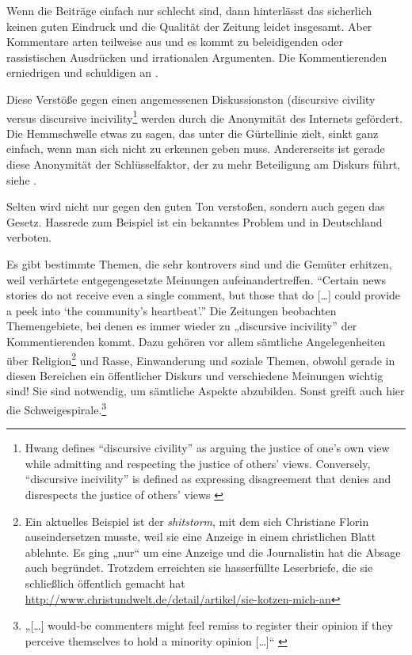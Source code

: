 Wenn die Beiträge einfach nur schlecht sind, dann hinterlässt das sicherlich
keinen guten Eindruck und die Qualität der Zeitung leidet insgesamt. Aber
Kommentare arten teilweise aus und es kommt zu beleidigenden oder rassistischen
Ausdrücken und irrationalen Argumenten. Die Kommentierenden erniedrigen und
schuldigen an \autocite[S.~103]{reich}.

Diese Verstöße gegen einen angemessenen Diskussionston (\glqq discursive
civility\grqq{} versus \glqq discursive incivility\grqq\footnote{Hwang defines
  ``discursive civility'' as arguing the justice of one's own view while
  admitting and respecting the justice of others' views. Conversely,
  ``discursive incivility'' is defined as expressing disagreement that denies
and disrespects the justice of others' views \autocite{hwang}
\autocite[S.~6/7]{santana:2014}} werden durch die Anonymität des Internets
gefördert. Die Hemmschwelle etwas zu sagen, das unter die Gürtellinie zielt,
sinkt ganz einfach, wenn man sich nicht zu erkennen geben muss. Andererseits ist
gerade diese Anonymität der Schlüsselfaktor, der zu mehr Beteiligung am Diskurs
führt, siehe
.

Selten wird nicht nur gegen den guten Ton verstoßen, sondern auch gegen das
Gesetz. Hassrede zum Beispiel ist ein bekanntes Problem und in Deutschland
verboten.

Es gibt bestimmte Themen, die sehr kontrovers sind und die Gemüter erhitzen,
weil verhärtete entgegengesetzte Meinungen aufeinandertreffen. ``Certain news
stories do not receive even a single comment, but those that do [\ldots] could
provide a peek into `the community’s heartbeat'.'' \autocite[S.~181]{loke} Die
Zeitungen beobachten Themengebiete, bei denen es immer wieder zu „discursive
incivility” der Kommentierenden kommt. Dazu gehören vor allem sämtliche
Angelegenheiten über Religion\footnote{Ein aktuelles Beispiel ist der {\slshape
shitstorm}, mit dem sich Christiane Florin auseindersetzen musste, weil sie eine
Anzeige in einem christlichen Blatt ablehnte. Es ging „nur“ um eine Anzeige und
die Journalistin hat die Absage auch begründet. Trotzdem erreichten sie
hasserfüllte Leserbriefe, die sie schließlich öffentlich gemacht hat
\url{http://www.christundwelt.de/detail/artikel/sie-kotzen-mich-an}} und Rasse,
Einwanderung und soziale Themen, obwohl gerade in diesen Bereichen ein
öffentlicher Diskurs und verschiedene Meinungen wichtig sind! Sie sind
notwendig, um sämtliche Aspekte abzubilden. Sonst greift auch hier die
Schweigespirale.\footnote{„[\ldots] would-be commenters might feel remiss to
register their opinion if they perceive themselves to hold a minority opinion
[\ldots]“ \autocite[S.~12]{santana:2014}}

